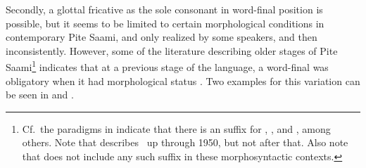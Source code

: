 Secondly, a glottal fricative \ipa{[h]} as the sole consonant in word-final position is possible, but it seems to be limited to certain morphological conditions in contemporary Pite Saami, and only realized by some speakers, and then inconsistently. 
However, some of the literature describing older stages of Pite Saami\footnote{Cf.~the paradigms in \citet[150--159]{Lehtiranta1992} indicate that there is an  suffix for , ,  and , among others. Note that \citet{Lehtiranta1992} describes \PS\ up through 1950, but not after that. Also note that \citet[104,120]{Lagercrantz1926} does not include any such suffix in these morphosyntactic contexts.} indicates that at a previous stage of the language, a word-final  was obligatory when it had morphological status%
. Two examples for this variation can be seen in  and .
\ea\label{work2SGPRS}
\z
\ea\label{fishDIMGENSG}
\z



